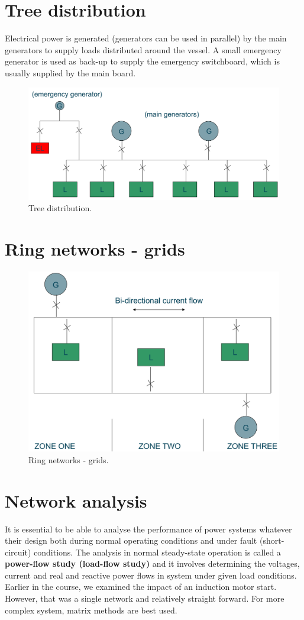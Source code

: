 \section{Tree distribution}
Electrical power is generated (generators can be used in parallel) by the main generators to supply loads distributed around the vessel. A small emergency generator is used as back-up to supply the emergency switchboard, which is usually supplied by the main board.
\begin{figure}[H]
	\centering
	\includegraphics[width = \textwidth]{./img/figure47.png}
	\caption{Tree distribution.}
\end{figure}
\section{Ring networks - grids}
\begin{figure}[H]
	\centering
	\includegraphics[width = \textwidth]{./img/figure48.png}
	\caption{Ring networks - grids.}
\end{figure}
\section{Network analysis}
It is essential to be able to analyse the performance of power systems whatever their design both during normal operating conditions and under fault (short-circuit) conditions. The analysis in normal steady-state operation is called a \textbf{power-flow study (load-flow study)} and it involves determining the voltages, current and real and reactive power flows in system under given load conditions. Earlier in the course, we examined the impact of an induction motor start. However, that was a single network and relatively straight forward. For more complex system, matrix methods are best used.

